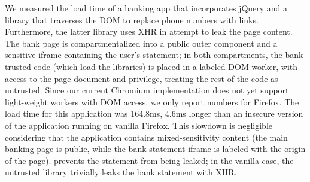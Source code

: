 We measured the load time of a banking app that incorporates jQuery and
a library that traverses the DOM to replace phone numbers with links.
%
Furthermore, the latter library uses XHR in attempt to leak the page content.
%
The bank page is compartmentalized into a public outer component and
a sensitive iframe containing the user's statement;
in both compartments, the bank trusted code (which load the libraries)
is placed in a labeled DOM worker, with access to the page document
and privilege, treating the rest of the code as untrusted.
%
Since our current Chromium implementation does not yet support
light-weight workers with DOM access, we only report numbers for
Firefox.
%
The load time for this application was 164.8ms, 4.6ms longer than an
insecure version of the application running on vanilla Firefox.
%
%
This slowdown is negligible considering that the
application contains mixed-sensitivity content (the main banking page
is public, while the bank statement iframe is labeled with the origin
of the page). \sys{} prevents the statement from being leaked; in the vanilla
case, the untrusted library trivially leaks the bank statement with
XHR\@.





